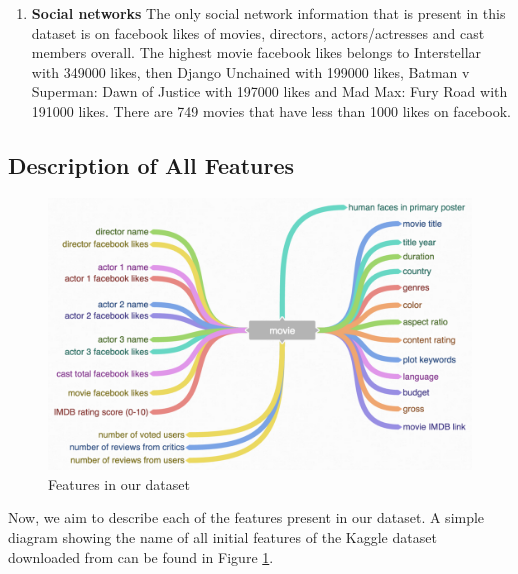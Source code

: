 \documentclass[journal,transmag]{IEEEtran}
\begin{document}
\begin{enumerate}
\item{\textbf{Social networks}} The only social network information that is present in this dataset is on facebook likes of movies, directors, actors/actresses and cast members overall. The highest movie facebook likes belongs to Interstellar with 349000 likes, then Django Unchained with 199000 likes, Batman v Superman: Dawn of Justice with 197000 likes and Mad Max: Fury Road with 191000 likes. There are 749 movies that have less than 1000 likes on facebook.
\end{enumerate}

\subsection{Description of All Features}
\begin{figure}
\includegraphics[scale=.22]{fig_feat.png}
 \caption{Features in our dataset}
\label{fig_feat}
\end{figure}

Now, we aim to describe each of the features present in our dataset. A simple diagram showing the name of all initial features of the Kaggle dataset downloaded from \cite{refCreator} can be found in Figure \ref{fig_feat}.
\end{document}
